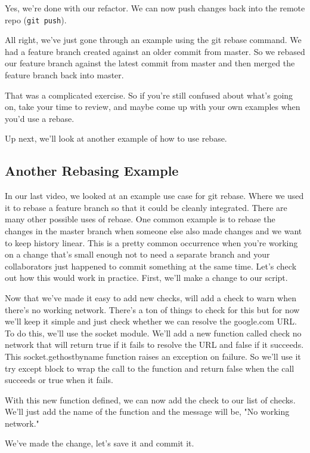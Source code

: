 Yes, we're done with our refactor. We can now push changes back into the remote repo (\verb|git push|).

All right, we've just gone through an example using the git rebase command. We had a feature branch created against an older commit from master. So we rebased our feature branch against the latest commit from master and then merged the feature branch back into master.

That was a complicated exercise. So if you're still confused about what's going on, take your time to review, and maybe come up with your own examples when you'd use a rebase.

Up next, we'll look at another example of how to use rebase.

\subsection{Another Rebasing Example} \label{W303d}

In our last video, we looked at an example use case for git rebase. Where we used it to rebase a feature branch so that it could be cleanly integrated. There are many other possible uses of rebase. One common example is to rebase the changes in the master branch when someone else also made changes and we want to keep history linear. This is a pretty common occurrence when you're working on a change that's small enough not to need a separate branch and your collaborators just happened to commit something at the same time. Let's check out how this would work in practice. First, we'll make a change to our script.

Now that we've made it easy to add new checks, will add a check to warn when there's no working network. There's a ton of things to check for this but for now we'll keep it simple and just check whether we can resolve the google.com URL. To do this, we'll use the socket module. We'll add a new function called check no network that will return true if it fails to resolve the URL and false if it succeeds. This socket.gethostbyname function raises an exception on failure. So we'll use it try except block to wrap the call to the function and return false when the call succeeds or true when it fails.

With this new function defined, we can now add the check to our list of checks. We'll just add the name of the function and the message will be, "No working network."

We've made the change, let's save it and commit it.

